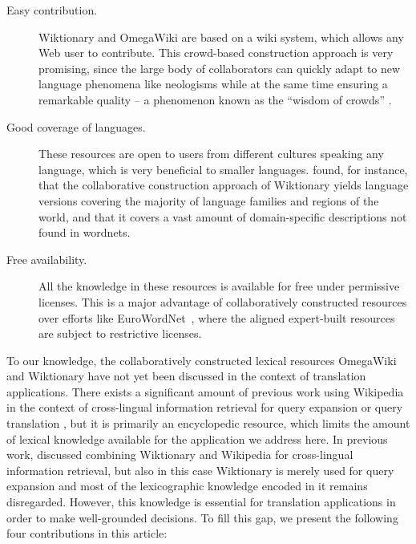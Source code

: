 \documentclass[output=paper]{LSP/langsci}
\begin{document}
\begin{description}\sloppy
\item[Easy contribution.] Wiktionary and OmegaWiki are based on a wiki system, which allows any Web user to contribute. This  crowd-based construction approach is very promising, since the large body of collaborators can quickly adapt to new language phenomena like neologisms while at the same time ensuring a remarkable quality -- a phenomenon known as the ``wisdom of crowds'' \citep{Surowiecki05}. 
\item[Good coverage of languages.] These resources are open to users from different cultures speaking any language, which is very beneficial to smaller languages. \citet{Meyer12a} found, for instance, that the collaborative construction approach of Wiktionary yields language versions covering the majority of language families and regions of the world, and that it covers a vast amount of domain-specific descriptions not found in wordnets.
\item[Free availability.] All the knowledge in these resources is available for free under permissive licenses. This is a major advantage of collaboratively constructed resources over efforts like EuroWordNet~\citep{Vossen1998}, where the aligned expert-built resources are subject to restrictive licenses. 
\end{description}

\noindent To our knowledge, the collaboratively constructed lexical resources OmegaWiki and Wiktionary have not yet been discussed in the context of translation applications. There exists a significant amount of previous work using Wikipedia in the context of cross-lingual information retrieval for query expansion or query translation \citep{EAMT2010,TUD-CS-2011-0067,Potthast:2008:WMR:1793274.1793338}, but it is primarily an encyclopedic resource, which limits the amount of lexical knowledge available for the application we address here. In previous work, \citet{TUD-CS-2009-0006} discussed combining Wiktionary and Wikipedia for cross-lingual information retrieval, but also in this case Wiktionary is merely used for query expansion and most of the lexicographic knowledge encoded in it remains disregarded. However, this knowledge is essential for translation applications in order to make well-grounded decisions. To fill this gap, we present the following four contributions in this article:
\end{document}
